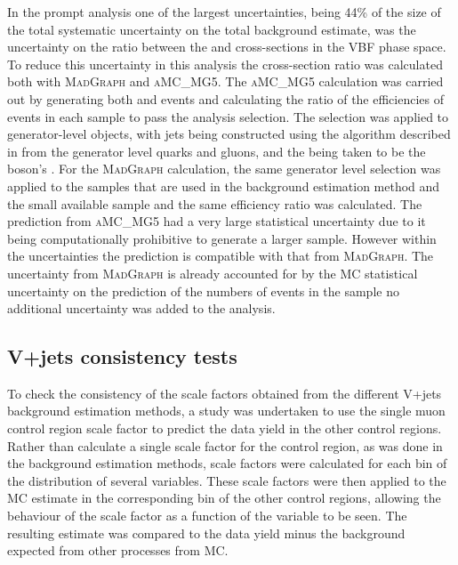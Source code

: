 In the prompt analysis one of the largest uncertainties, being 44\% of the size of the total systematic uncertainty on the total background estimate, was the uncertainty on the ratio between the \Zmumu and \Znunu cross-sections in the \ac{VBF} phase space. To reduce this uncertainty in this analysis the cross-section ratio was calculated both with \textsc{MadGraph} and \textsc{aMC\@NLO\_MG5}. The \textsc{aMC\@NLO\_MG5} calculation was carried out by generating both \Zmumu and \Znunu events and calculating the ratio of the efficiencies of events in each sample to pass the analysis selection. The selection was applied to generator-level objects, with jets being constructed using the algorithm described in  from the generator level quarks and gluons, and the \MET being taken to be the \PZ boson's \pt. For the \textsc{MadGraph} calculation, the same generator level selection was applied to the \Zmumu samples that are used in the background estimation method and the small available \Znunu sample and the same efficiency ratio was calculated. The prediction from \textsc{aMC\@NLO\_MG5} had a very large statistical uncertainty due to it being computationally prohibitive to generate a larger sample. However within the uncertainties the prediction is compatible with that from \textsc{MadGraph}. The uncertainty from \textsc{MadGraph} is already accounted for by the \ac{MC} statistical uncertainty on the prediction of the numbers of events in the \Zmumu sample no additional uncertainty was added to the analysis.

\subsection{V+jets consistency tests}
\label{sec:parkedclosure}
To check the consistency of the scale factors obtained from the different V+jets background estimation methods, a study was undertaken to use the single muon control region scale factor to predict the data yield in the other control regions. Rather than calculate a single scale factor for the control region, as was done in the background estimation methods, scale factors were calculated for each bin of the distribution of several variables. These scale factors were then applied to the \ac{MC} estimate in the corresponding bin of the other control regions, allowing the behaviour of the scale factor as a function of the variable to be seen. The resulting estimate was compared to the data yield minus the background expected from other processes from \ac{MC}.

